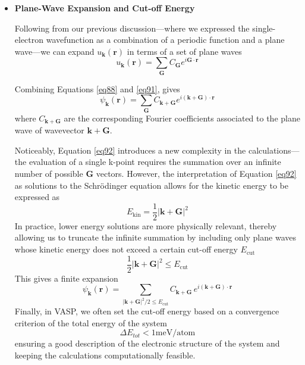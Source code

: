 \begin{itemize}
    \item \textbf{Plane-Wave Expansion and Cut-off Energy}  
    
Following from our previous discussion---where we expressed the single-electron 
wavefunction as a combination of a periodic function and a plane wave---we can expand $u_{\mathbf{k}}(\mathbf{r})$ in terms of a set of plane waves 
\begin{equation}
\label{eq91}
    u_{\mathbf{k}}(\mathbf{r}) = \sum_{\mathbf{G}} C_{\mathbf{G}} e^{i\mathbf{G} \cdot \mathbf{r}}
\end{equation}

Combining Equations \ref{eq88} and \ref{eq91}, gives 
\begin{equation}
    \label{eq92}
    \psi_{\mathbf{k}}(\mathbf{r}) =
    \sum_{\mathbf{G}} C_{\mathbf{k+G}} e^{i(\mathbf{k} + \mathbf{G}) \cdot \mathbf{r}}
\end{equation}
where $C_{\mathbf{k+G}}$ are the corresponding Fourier coefficients 
associated to the plane wave of wavevector $\mathbf{k} + \mathbf{G}$.

Noticeably, Equation \ref{eq92} introduces a new complexity in the calculations---the 
evaluation of a single k-point requires the summation over an infinite 
number of possible $\mathbf{G}$ vectors. However, the interpretation of 
Equation \ref{eq92} as solutions to the Schrödinger equation allows for 
the kinetic energy to be expressed as
\begin{equation}
    \label{eq93}
    E_{\text{kin}} = \frac{1}{2} |\mathbf{k} + \mathbf{G}|^2
\end{equation}
In practice, lower energy solutions are more physically relevant,
thereby allowing us to truncate the infinite summation by including 
only plane waves whose kinetic energy does not exceed a certain cut-off energy
$E_{\text{cut}}$
\begin{equation}
\label{eq94} 
\frac{1}{2} |\mathbf{k} + \mathbf{G}|^2 \leq E_{\text{cut}}
\end{equation}
This gives a finite expansion
\begin{equation}
    \label{eq95}
    \psi_{\mathbf{k}}(\mathbf{r}) = \sum_{|\mathbf{k} + \mathbf{G}|^2/2 \leq E_{\text{cut}}}
C_{\mathbf{k}+\mathbf{G}} \, e^{i(\mathbf{k} + \mathbf{G}) \cdot \mathbf{r}}
\end{equation}
Finally, in VASP, we often set the cut-off energy based on a convergence criterion of 
the total energy of the system 
\begin{equation}
\label{eq96}
    \Delta E_{tot} < 1 \text{meV/atom}
\end{equation}
ensuring a good description of the electronic structure of the system 
and keeping the calculations computationally feasible.

\end{itemize}


